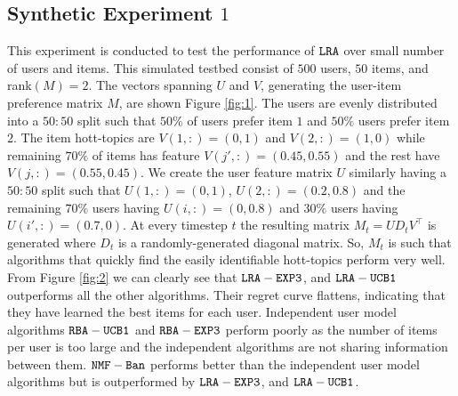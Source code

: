 

\subsection{Synthetic Experiment $1$}
This experiment is conducted to test the performance of ${\tt LRA}$ over small number of users and items. This simulated testbed consist of $500$ users, $50$ items, and rank$(M) = 2$. The vectors spanning $U$ and $V$, generating the user-item preference matrix $M$, are shown Figure \ref{fig:1}. The users are evenly distributed into a $50:50$ split such that $50\%$ of users prefer item $1$ and $50\%$ users prefer item  $2$. The item hott-topics are $V(1,:) = (0,1)$ and $V(2,:) = (1, 0)$ while remaining $70\%$ of items has feature $V(j',:) = (0.45, 0.55)$ and the rest have $V(j,:) = (0.55, 0.45)$. We create the user feature matrix $U$ similarly having a $50:50$ split such that $U(1,:) = (0,1)$, $U(2,:) = (0.2,0.8)$ and the remaining $70\%$ users having $U(i,:) = (0,0.8)$ and $30\%$ users having $U(i',:) = (0.7,0)$. At every timestep $t$ the resulting matrix $M_t =UD_tV^{\intercal}$ is generated where $D_t$ is a randomly-generated diagonal matrix. So, $M_t$ is  such that algorithms that quickly find the easily identifiable hott-topics perform very well. From Figure \ref{fig:2} we can clearly see that ${\tt LRA-EXP3}$, and ${\tt LRA-UCB1}$ outperforms all the other algorithms. Their regret curve flattens, indicating that they have learned the best items for each user. Independent user model algorithms ${\tt RBA-UCB1}$ and ${\tt RBA-EXP3}$  perform poorly as the number of items per user is too large and the independent algorithms are not sharing information between them. ${\tt NMF-Ban}$ performs better than the independent user model algorithms but is outperformed by ${\tt LRA-EXP3}$, and ${\tt LRA-UCB1}$.

